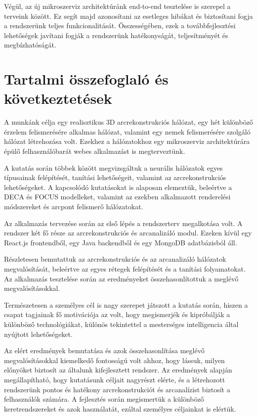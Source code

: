 \documentclass[12pt,a4]{article}
\begin{document}
        Végül, az új mikroszerviz architektúránk end-to-end tesztelése is szerepel a terveink között. Ez segít majd azonosítani az esetleges hibákat és biztosítani fogja a rendszerünk teljes funkcionalitását. Összességében, ezek a továbbfejlesztési lehetőségek javítani fogják a rendszerünk hatékonyságát, teljesítményét és megbízhatóságát.

    \section{Tartalmi összefoglaló és következtetések}

        A munkánk célja egy realisztikus 3D arcrekonstrukciós hálózat, egy hét különböző érzelem felismerésére alkalmas hálózat, valamint egy nemek felismerésére szolgáló hálózat létrehozása volt. Ezekhez a hálózatokhoz egy mikroszerviz architektúrára épülő felhasználóbarát webes alkalmazást is megterveztünk.
        
        A kutatás során többek között megvizsgáltuk a neurális hálózatok egyes típusainak felépítését, tanítási lehetőségeit, valamint az arcrekonstrukciós lehetőségeket. A kapcsolódó kutatásokat is alaposan elemeztük, beleértve a DECA és FOCUS modelleket, valamint az ezekben alkalmazott renderelési módszereket és arcpont felismerő hálózatokat.
        
        Az alkalmazás tervezése során az első lépés a rendszerterv megalkotása volt. 
        A rendszer két fő része az arcrekonstrukciós és arcanalizáló modul. Ezeken kívül
        egy React.js frontendből, egy Java backendből és egy MongoDB adatbázisból áll.
        
        Részletesen bemutattuk az arcrekonstrukciós és az arcanalizáló hálózatok megvalósítását, 
        beleértve az egyes rétegek felépítését és a tanítási folyamatokat. Az alkalmazás tesztelése során az eredményeket összehasonlítottuk a meglévő megvalósításokkal.

        Természetesen a személyes cél is nagy szerepet játszott a kutatás során, hiszen a csapat tagjainak fő motivációja az volt, hogy megismerjék és kipróbálják a különböző technológiákat, különös tekintettel a mesterséges intelligencia által nyújtott lehetőségeket.

        Az elért eredmények bemutatása és azok összehasonlítása meglévő megvalósításokkal kiemelkedő fontosságú volt ahhoz, hogy lássuk, milyen előnyöket biztosít az általunk kifejlesztett rendszer. Az eredmények alapján megállapítható, hogy kutatásunk céljait nagyrészt elérte, és a létrehozott rendszerünk pontos és hatékony arcrekonstrukciót és arcanalízist biztosít a felhasználók számára. A fejlesztés során megismertük a különböző keretrendszereket és azok használatát, ezáltal személyes céljainkat is elértük.
\end{document}
